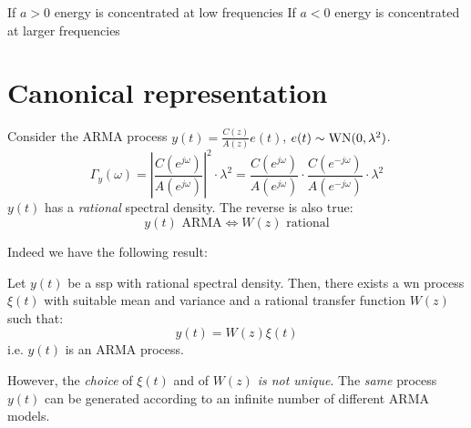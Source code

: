 If $a>0$ energy is concentrated at low frequencies
If $a<0$ energy is concentrated at larger frequencies

\section{Canonical representation}
\begin{exa}
Consider the ARMA process $y(t)=\frac{C(z)}{A(z)}e(t)$, $e(t)\sim \operatorname{WN}(0,\lambda^2)$.
\[
	\Gamma _{y}(\omega )=\left|\frac{C(e^{j\omega})}{A(e^{j\omega})}\right|^2 \cdot\lambda^2 =\frac{C(e^{j\omega})}{A(e^{j\omega} )} \cdot \frac{C(e^{-j\omega})}{A(e^{-j\omega} )}\cdot\lambda^2 
\]
$y(t)$ has a \emph{rational} spectral density. The reverse is also true:
\[
	y(t) \text{ ARMA} \iff W(z) \text{ rational}
\]
\end{exa}
Indeed we have the following result:
\begin{thm}
	Let $y(t)$ be a \gls{ssp} with rational spectral density.
	Then, there exists a \gls{wn} process $\xi(t)$ with suitable mean and variance and a rational transfer function $W(z)$ such that:
	\[
		y(t)=W(z)\xi(t)
	\]
	i.e. $y(t)$ is an ARMA process.
\end{thm}

However, the \emph{choice} of $\xi(t)$ and of $W(z)$ \emph{is not unique}.
The \emph{same} process $y(t)$ can be generated according to an infinite number of different ARMA models.

